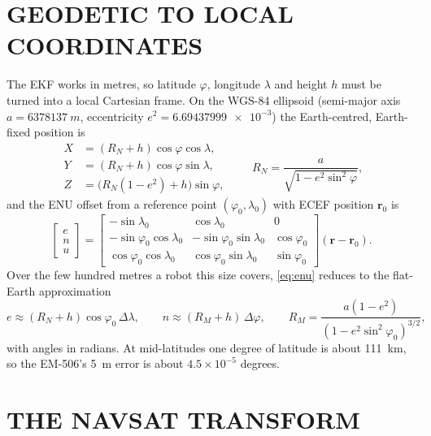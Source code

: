 \section{GEODETIC TO LOCAL COORDINATES}

The EKF works in metres, so latitude $\varphi$, longitude $\lambda$ and height
$h$ must be turned into a local Cartesian frame. On the WGS-84 ellipsoid
(semi-major axis $a=\SI{6378137}{m}$, eccentricity
$e^2=\num{6.69437999e-3}$) the Earth-centred, Earth-fixed position is
\begin{equation}\label{eq:ecef}
\begin{aligned}
X &= (R_N+h)\cos\varphi\cos\lambda,\\
Y &= (R_N+h)\cos\varphi\sin\lambda,\\
Z &= \bigl(R_N(1-e^2)+h\bigr)\sin\varphi,
\end{aligned}
\qquad R_N=\frac{a}{\sqrt{1-e^2\sin^2\varphi}},
\end{equation}
and the ENU offset from a reference point $(\varphi_0,\lambda_0)$ with ECEF
position $\bm r_0$ is
\begin{equation}\label{eq:enu}
\begin{bmatrix}e\\n\\u\end{bmatrix}=
\begin{bmatrix}
-\sin\lambda_0 & \cos\lambda_0 & 0\\
-\sin\varphi_0\cos\lambda_0 & -\sin\varphi_0\sin\lambda_0 & \cos\varphi_0\\
\cos\varphi_0\cos\lambda_0 & \cos\varphi_0\sin\lambda_0 & \sin\varphi_0
\end{bmatrix}(\bm r-\bm r_0).
\end{equation}
Over the few hundred metres a robot this size covers, \eqref{eq:enu} reduces
to the flat-Earth approximation
\begin{equation}\label{eq:flat}
e\approx (R_N+h)\cos\varphi_0\,\Delta\lambda,\qquad
n\approx (R_M+h)\,\Delta\varphi,\qquad
R_M=\frac{a(1-e^2)}{(1-e^2\sin^2\varphi_0)^{3/2}},
\end{equation}
with angles in radians. At mid-latitudes one degree of latitude is about
\SI{111}{km}, so the EM-506's \SI{5}{m} error is about $4.5\times10^{-5}$
degrees.

\section{THE NAVSAT TRANSFORM}
\label{sec:navsat}

